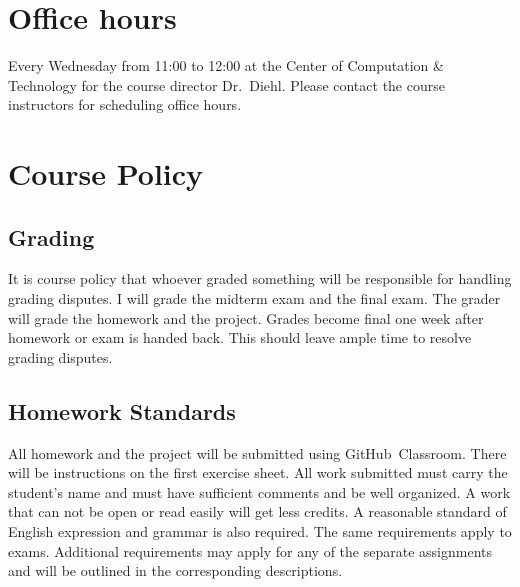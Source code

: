 \documentclass[11pt,letterpaper]{article}
\begin{document}
\section*{Office hours}
Every Wednesday from 11:00 to 12:00 at the Center of Computation \& Technology 
for the course director Dr.\ Diehl. Please contact the course instructors for
scheduling office hours.

\section*{Course Policy}

\subsection*{Grading}
It is course policy that whoever graded something will be responsible for handling grading disputes. I will grade the midterm exam and the final exam. The grader will grade the homework and the project. Grades become final one week after homework or exam is handed back. This should leave ample time to resolve grading disputes.

\subsection*{Homework Standards}
All homework and the project will be submitted using GitHub\textsuperscript{\textregistered}~Classroom. There will be instructions on the first exercise sheet. All work submitted must carry the student's name and must have sufficient comments and be well organized. A work that can not be open or read easily will get less credits.  A  reasonable standard  of  English  expression  and  grammar  is  also  required.  The  same  requirements  apply  to  exams. Additional requirements   may   apply   for   any   of   the   separate   assignments   and   will   be   outlined   in   the   corresponding descriptions.
 
\end{document}
